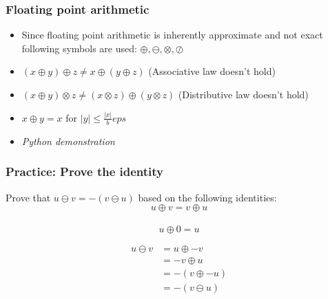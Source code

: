 \documentclass{beamer}
\begin{document}
\begin{frame}
\frametitle{Floating point arithmetic}
\begin{itemize}
\item Since floating point arithmetic is inherently approximate and not exact following symbols are used: $\oplus,\ominus, \otimes,\oslash$
\item  $(x \oplus y) \oplus z \neq x \oplus (y \oplus z) $ (Associative law doesn't hold)
\item $(x \oplus y) \otimes z \neq (x \otimes z) \oplus (y \otimes z) $ (Distributive law doesn't hold)
\item $x \oplus y = x$ for $|y| \leq \frac{|x|}{b}eps$
\item \textit{Python demonstration}
\end{itemize}
\end{frame}


\begin{frame}
\frametitle{Practice: Prove the identity}

Prove that $u \ominus v = -(v \ominus u)$ based on the following identities:
$$u \oplus v = v \oplus u$$\\
$$u \oplus 0 = u $$


\pause

\begin{align}
u \ominus v &= u \oplus -v\\
&= -v \oplus u \\
&= - (v \oplus -u)\\
&= -(v \ominus u)
\end{align}

\end{frame}
\end{document}
